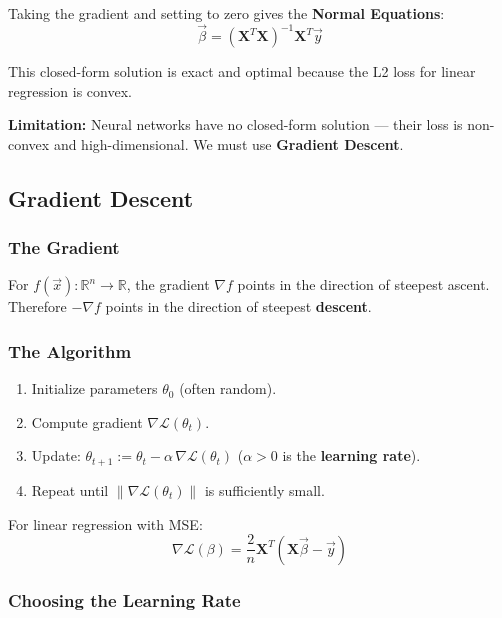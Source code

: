 \documentclass[11pt]{article}
\begin{document}
Taking the gradient and setting to zero gives the \textbf{Normal Equations}:
\[
\boxed{\vec{\beta} = (\boldsymbol{X}^T\boldsymbol{X})^{-1}\boldsymbol{X}^T\vec{y}}
\]

This closed-form solution is exact and optimal because the L2 loss for linear regression is convex.

\begin{notebox}
\textbf{Limitation:} Neural networks have no closed-form solution --- their loss is non-convex and high-dimensional. We must use \textbf{Gradient Descent}.
\end{notebox}

\subsection{Gradient Descent}

\subsubsection{The Gradient}

For $f(\vec{x}) : \mathbb{R}^n \to \mathbb{R}$, the gradient $\nabla f$ points in the direction of steepest ascent. Therefore $-\nabla f$ points in the direction of steepest \textbf{descent}.

\subsubsection{The Algorithm}

\begin{enumerate}
  \item Initialize parameters $\theta_0$ (often random).
  \item Compute gradient $\nabla\mathcal{L}(\theta_t)$.
  \item Update: $\theta_{t+1} := \theta_t - \alpha\,\nabla\mathcal{L}(\theta_t)$ \quad ($\alpha > 0$ is the \textbf{learning rate}).
  \item Repeat until $\|\nabla\mathcal{L}(\theta_t)\|$ is sufficiently small.
\end{enumerate}

For linear regression with MSE:
\[
\nabla\mathcal{L}(\beta) = \frac{2}{n}\boldsymbol{X}^T\!\left(\boldsymbol{X}\vec{\beta} - \vec{y}\right)
\]

\subsubsection{Choosing the Learning Rate}
\end{document}
